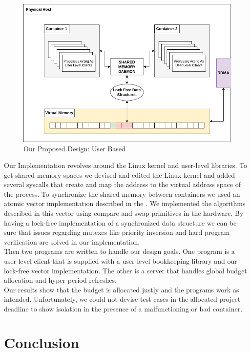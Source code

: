 \documentclass[a4paper, 11pt, twocolumn]{article}
\theoremstyle{nonumberplain}
\begin{document}
\begin{figure}[H]
    \centering
    \includegraphics[scale=0.3]{user.png}
    \caption{Our Proposed Design: User Based}
\end{figure}
Our Implementation revolves around the Linux kernel and user-level libraries.
To get shared memory spaces we devised and edited the Linux kernel
and added several syscalls that create and map the address to the
virtual address space of the process. To synchronize the shared memory
between containers we used an atomic vector implementation described in the
\cite{cas}. We implemented the algorithms described in this vector using
compare and swap primitives in the hardware. By having a lock-free
implementation of a synchronized data structure we can be sure that issues
regarding mutexes like priority inversion and hard program verification are
solved in our implementation. \\
Then two programs are written to handle our design goals. One program is a user-level client that is supplied with a user-level bookkeeping library and our
lock-free vector implementation. The other is a server that handles global
budget allocation and hyper-period refreshes. \\
Our results show that the budget is allocated justly and the programs work as
intended. Unfortunately, we could not devise test cases in the allocated
project deadline to show isolation in the presence of a malfunctioning or
bad container.

\section{Conclusion}
\end{document}
